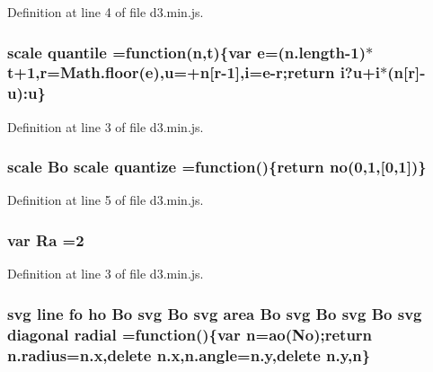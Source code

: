 Definition at line 4 of file d3.\+min.\+js.

\subsubsection[{quantile}]{ {\bf scale} quantile =function({\bf n},t)\{var {\bf e}=(n.\+length-\/1)$\ast$t+1,{\bf r}=Math.\+floor({\bf e}),u=+{\bf n}[{\bf r}-\/1],{\bf i}={\bf e}-\/{\bf r};{\bf return} {\bf i}?u+{\bf i}$\ast$({\bf n}[{\bf r}]-\/u)\+:u\}}\label{d3_8min_8js_a9f353500de5c4d82e3994d21dc66ef81}


Definition at line 3 of file d3.\+min.\+js.

\subsubsection[{quantize}]{ {\bf scale} {\bf Bo} {\bf scale} quantize =function()\{{\bf return} {\bf no}(0,1,[0,1])\}}\label{d3_8min_8js_a2d61b35b6280797e7934171d39161df6}


Definition at line 5 of file d3.\+min.\+js.

\subsubsection[{Ra}]{\setlength{\rightskip}{0pt plus 5cm}var Ra =2}\label{d3_8min_8js_af914f7d7923e99d47363818deb69afed}


Definition at line 3 of file d3.\+min.\+js.

\subsubsection[{radial}]{ {\bf svg} {\bf line} {\bf fo} {\bf ho} {\bf Bo} {\bf svg} {\bf Bo} {\bf svg} {\bf area} {\bf Bo} {\bf svg} {\bf Bo} {\bf svg} {\bf Bo} {\bf svg} {\bf diagonal} radial =function()\{var {\bf n}={\bf ao}({\bf No});{\bf return} n.\+radius={\bf n.\+x},delete {\bf n.\+x},n.\+angle=n.\+y,delete n.\+y,{\bf n}\}}\label{d3_8min_8js_a0a5a5ac85b35f741ef6b0eb3fc8edb9b}



